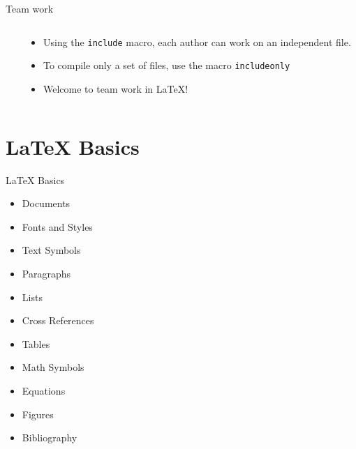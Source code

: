 \documentclass{beamer}
\begin{document}
\begin{frame}[fragile]{Team work}
\begin{columns}
\begin{column}{5cm}

\end{column}
\begin{column}{5cm}
\begin{itemize}
\item Using the \texttt{include} macro, each author can work on an independent file. 
\item To compile only a set of files, use the macro \texttt{includeonly}
\item Welcome to team work in \LaTeX{}!
\end{itemize}
\end{column}
\end{columns}
\end{frame}

\section{\LaTeX{} Basics}

	\begin{frame}{LaTeX{} Basics}
		\begin{itemize}
        	\item Documents
        	\item Fonts and Styles
            \item Text Symbols
            \item Paragraphs
            \item Lists
            \item Cross References
            \item Tables
            \item Math Symbols
        	\item Equations
            \item Figures
            \item Bibliography
		\end{itemize}
	\end{frame}
\end{document}
